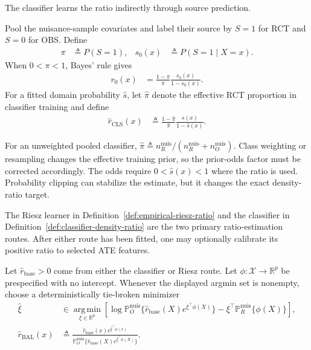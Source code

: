 The classifier learns the ratio indirectly through source prediction.
\begin{definition}
\label{def:classifier-density-ratio}
Pool the nuisance-sample covariates and label their source by $S=1$ for RCT and $S=0$ for OBS. Define
\begin{align*}
	\pi &\triangleq P(S=1),
	&
	s_0(x) &\triangleq P(S=1\mid X=x).
\end{align*}
When $0<\pi<1$, Bayes' rule gives
\begin{align}\label{eq:ratio-classifier-bayes}
	r_0(x) &= \frac{1-\pi}{\pi}\frac{s_0(x)}{1-s_0(x)}.
\end{align}
For a fitted domain probability $\widehat s$, let $\widehat\pi$ denote the effective RCT proportion in classifier training and define
\begin{align}\label{eq:ratio-classifier-estimator}
	\widehat r_{\mathrm{CLS}}(x) &\triangleq
	\frac{1-\widehat\pi}{\widehat\pi}
	\frac{\widehat s(x)}{1-\widehat s(x)}.
\end{align}
\end{definition}

For an unweighted pooled classifier,
$\widehat\pi\triangleq
n_R^{\mathrm{nuis}}/(n_R^{\mathrm{nuis}}+n_O^{\mathrm{nuis}})$. Class
weighting or resampling changes the effective training prior, so the prior-odds
factor must be corrected accordingly. The odds require
$0<\widehat s(x)<1$ where the ratio is used. Probability clipping can
stabilize the estimate, but it changes the exact density-ratio target.

The Riesz learner in Definition~\ref{def:empirical-riesz-ratio} and the classifier in Definition~\ref{def:classifier-density-ratio} are the two primary ratio-estimation routes. After either route has been fitted, one may optionally calibrate its positive ratio to selected ATE features.

\begin{definition}
\label{def:classifier-calibrated-balance}
Let $\widehat r_{\mathrm{base}}>0$ come from either the classifier or Riesz
route. Let $\phi:\mathcal X\to\mathbb R^p$ be prespecified with no intercept.
Whenever the displayed argmin set is nonempty, choose a deterministically
tie-broken minimizer
\begin{align}
	\widehat\xi
	&\in\operatorname*{arg\,min}_{\xi\in\mathbb R^p}
	\left[
	\log\mathbb P_O^{\mathrm{nuis}}
	\{\widehat r_{\mathrm{base}}(X)e^{\xi^\top\phi(X)}\}
	-\xi^\top\mathbb P_R^{\mathrm{nuis}}\{\phi(X)\}
	\right],
	\label{eq:ratio-calibration-objective}
	\\
	\widehat r_{\mathrm{BAL}}(x)
	&\triangleq
	\frac{\widehat r_{\mathrm{base}}(x)e^{\widehat\xi^\top\phi(x)}}
	{\mathbb P_O^{\mathrm{nuis}}
	\{\widehat r_{\mathrm{base}}(X)e^{\widehat\xi^\top\phi(X)}\}}.
	\label{eq:ratio-calibrated-estimator}
\end{align}
\end{definition}

